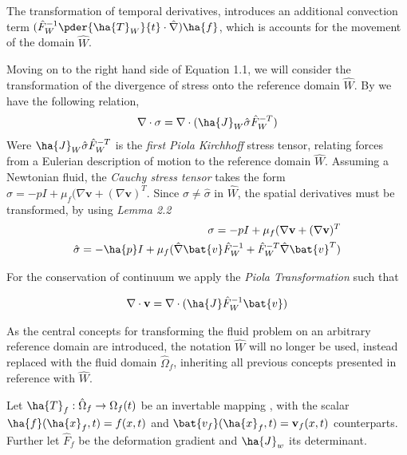 The transformation of temporal derivatives, introduces an additional convection term 
$ (\hat{F}_W^{-1} \pder{\ha{T}_W}{t} \cdot \hat{\nabla}) \ha{f}$, which is accounts for the movement of the domain $\hat{W}$. 

Moving on to the right hand side of Equation 1.1, we will consider the transformation of the divergence of stress onto the reference domain $\hat{W}$. By \cite{Richter2016} we have the following relation,
\begin{align}
\nabla \cdot \sigma = \nabla \cdot (\ha{J}_W \hat{\sigma}\hat{F}_W^{-T})
\end{align}
Were $\ha{J}_W \hat{\sigma}\hat{F}_W^{-T}$ is the \textit{first Piola Kirchhoff} stress tensor, relating forces from a Eulerian description of motion to the reference domain $\hat{W}$.
Assuming a Newtonian fluid, the \textit{Cauchy stress tensor} takes the form $\sigma = -p I + \mu_f(\nabla \mathbf{v} + (\nabla \mathbf{v})^T$. Since $\sigma \neq \hat{\sigma}$ in $\hat{W}$, the spatial derivatives must be transformed, by using \textit{Lemma 2.2}
\begin{align*}
\sigma = -p I + \mu_f(\nabla \mathbf{v} + (\nabla \mathbf{v})^T \\
\hat{\sigma} = -\ha{p} I + \mu_f(\hat{\nabla}\bat{v}\hat{F}_W^{-1} +\hat{F}_W^{-T}\hat{\nabla}\bat{v}^T )
\end{align*} 

For the conservation of continuum we apply the \textit{Piola Transformation} \cite{Richter2016}such that

\begin{align}
\nabla \cdot \mathbf{v} = \nabla \cdot (\ha{J} \hat{F}_W^{-1} \bat{v})
\end{align}

As the central concepts for transforming the fluid problem on an arbitrary reference domain are introduced, the notation $\hat{W}$ will no longer be used, instead replaced with the fluid domain $\hat{\Omega}_f$, inheriting all previous concepts presented in reference with $\hat{W}$.

 Let $\ha{T}_f : \hat{\Omega}_f \rightarrow \Omega_f (t)$ be an  invertable mapping , with the scalar $\ha{f}(\ha{x}_f, t) = f(x,t) $ and $\bat{v_f}(\ha{x}_f, t) = \mathbf{v}_f (x,t) $ counterparts. Further let $\hat{F}_f$ be the deformation gradient and  $\ha{J}_w$ its determinant.

